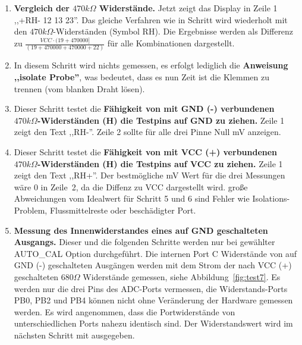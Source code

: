 \begin{enumerate}
\item {\bf Vergleich der \(470k\Omega\) Widerstände.}
Jetzt zeigt das Display in Zeile 1 ,,+RH- 12 13 23''. Das gleiche Verfahren wie in Schritt wird wiederholt mit den
 \(470k\Omega\)-Widerständen (Symbol RH).
Die Ergebnisse werden als Differenz zu  \(\frac{VCC \cdot (19 + 470000]}{ (19 + 470000 + 470000 + 22)} \) für alle Kombinationen dargestellt.
\item In diesem Schritt wird nichts gemessen, es erfolgt lediglich die {\bf Anweisung ,,isolate Probe''},
was bedeutet, dass es nun Zeit ist die Klemmen zu trennen (vom blanken Draht lösen).
\item Dieser Schritt testet die {\bf Fähigkeit von mit GND (-) verbundenen \(470k\Omega\)-Widerständen (H) die Testpins auf GND zu ziehen.}
Zeile 1 zeigt den Text ,,RH-''.
Zeile 2 sollte für alle drei Pinne  Null mV anzeigen.
\item Dieser Schritt testet die {\bf Fähigkeit von mit VCC (+) verbundenen \(470k\Omega\)-Widerständen (H) die Testpins auf VCC zu ziehen.}
Zeile 1 zeigt den Text ,,RH+''.
Der bestmögliche mV Wert für die drei Messungen wäre 0 in Zeile~2, da die Diffenz zu VCC dargestellt wird.
 große Abweichungen vom Idealwert für Schritt 5 und 6 sind Fehler wie Isolations-Problem, Flussmittelreste oder beschädigter Port.
\item {\bf Messung des Innenwiderstandes eines auf GND geschalteten Ausgangs.}
Dieser und die folgenden Schritte werden nur bei gewählter AUTO\_CAL Option durchgeführt.
Die internen Port C Widerstände von auf GND (-) geschalteten Ausgängen werden mit dem Strom
der nach VCC (+) geschalteten \(680\Omega\) Widerstände gemessen, siehe Abbildung~\ref{fig:test7}.
Es werden nur die drei Pins des ADC-Ports vermessen, die Widerstands-Ports  PB0, PB2 und PB4 können nicht
ohne Veränderung der Hardware gemessen werden.
Es wird angenommen, dass die Portwiderstände von unterschiedlichen Ports nahezu identisch sind.
Der Widerstandswert wird im nächsten Schritt mit ausgegeben.
\begin{figure}[H]
\centering

\end{figure}
\end{enumerate}
